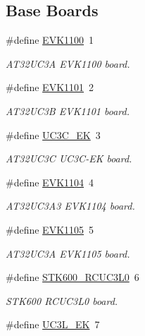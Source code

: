 \subsection*{Base Boards}
\begin{DoxyCompactItemize}
\item 
\#define \mbox{\hyperlink{group__group__common__boards_gaf70755335cc477c22a31a4126deddbcc}{E\+V\+K1100}}~1
\begin{DoxyCompactList}\small\item\em A\+T32\+U\+C3A E\+V\+K1100 board. \end{DoxyCompactList}\item 
\#define \mbox{\hyperlink{group__group__common__boards_gace9c401dee7de17633d3edb4a773a842}{E\+V\+K1101}}~2
\begin{DoxyCompactList}\small\item\em A\+T32\+U\+C3B E\+V\+K1101 board. \end{DoxyCompactList}\item 
\#define \mbox{\hyperlink{group__group__common__boards_ga134b9977e8acdca22a47a93daad9112d}{U\+C3\+C\+\_\+\+EK}}~3
\begin{DoxyCompactList}\small\item\em A\+T32\+U\+C3C U\+C3\+C-\/\+EK board. \end{DoxyCompactList}\item 
\#define \mbox{\hyperlink{group__group__common__boards_ga98bb86fc9e11beea9c609d63393ae3ff}{E\+V\+K1104}}~4
\begin{DoxyCompactList}\small\item\em A\+T32\+U\+C3\+A3 E\+V\+K1104 board. \end{DoxyCompactList}\item 
\#define \mbox{\hyperlink{group__group__common__boards_ga478ade34a9b0eb7dca14eb3f9b2f1b5a}{E\+V\+K1105}}~5
\begin{DoxyCompactList}\small\item\em A\+T32\+U\+C3A E\+V\+K1105 board. \end{DoxyCompactList}\item 
\#define \mbox{\hyperlink{group__group__common__boards_ga57e3c9540f0da9fc1135acba6cbaf253}{S\+T\+K600\+\_\+\+R\+C\+U\+C3\+L0}}~6
\begin{DoxyCompactList}\small\item\em S\+T\+K600 R\+C\+U\+C3\+L0 board. \end{DoxyCompactList}\item 
\#define \mbox{\hyperlink{group__group__common__boards_ga5119b352b04e0aad2323dc952a385995}{U\+C3\+L\+\_\+\+EK}}~7

\end{DoxyCompactItemize}
